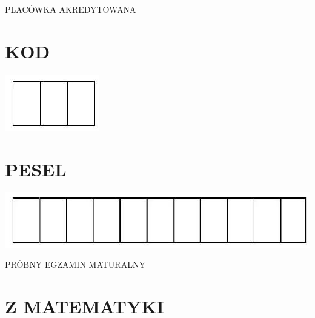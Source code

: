 \documentclass[10pt]{article}
\begin{document}
PLACÓWKA AKREDYTOWANA

\section*{KOD}
\begin{center}
\includegraphics[max width=\textwidth]{2024_11_21_8e981e1ab2c7e641f462g-01}
\end{center}

\section*{PESEL}
\begin{center}
\includegraphics[max width=\textwidth]{2024_11_21_8e981e1ab2c7e641f462g-01(1)}
\end{center}

PRÓBNY EGZAMIN MATURALNY

\section*{Z MATEMATYKI}
\end{document}
